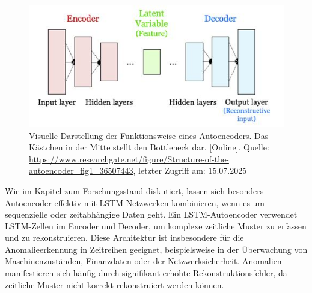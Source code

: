 \documentclass[a4paper,12pt]{article}
\begin{document}
	\begin{figure}[H]
		\centering
		\includegraphics[width=0.7\linewidth]{Bilder/screenshot004}
		\caption{Visuelle Darstellung der Funktionsweise eines Autoencoders. Das Kästchen in der Mitte stellt den Bottleneck dar. [Online]. Quelle: \url{https://www.researchgate.net/figure/Structure-of-the-autoencoder\_fig1\_36507443}, letzter Zugriff am: 15.07.2025}
		\label{fig:screenshot004}
	\end{figure}
	Wie im Kapitel zum Forschungsstand diskutiert, lassen sich besonders Autoencoder effektiv mit LSTM-Netzwerken kombinieren, wenn es um sequenzielle oder zeitabhängige Daten geht. Ein LSTM-Autoencoder verwendet LSTM-Zellen im Encoder und Decoder, um komplexe zeitliche Muster zu erfassen und zu rekonstruieren. Diese Architektur ist insbesondere für die Anomalieerkennung in Zeitreihen geeignet, beispielsweise in der Überwachung von Maschinenzuständen, Finanzdaten oder der Netzwerksicherheit. Anomalien manifestieren sich häufig durch signifikant erhöhte Rekonstruktionsfehler, da zeitliche Muster nicht korrekt rekonstruiert werden können.
	
\end{document}
